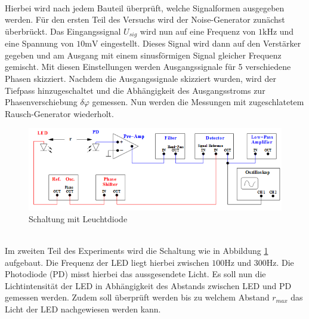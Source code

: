 \\
Hierbei wird nach jedem Bauteil überprüft, welche Signalformen ausgegeben werden.
Für den ersten Teil des Versuchs wird der Noise-Generator zunächst überbrückt.
Das Eingangssignal $U_{sig}$ wird nun auf eine Frequenz von $1\si{\kilo\hertz}$
und eine Spannung von $10\si{\milli\volt}$ eingestellt. Dieses Signal wird dann
auf den Verstärker gegeben und am Ausgang mit einem sinusförmigen Signal gleicher
Frequenz gemischt. Mit diesen Einstellungen werden Ausgangssignale für 5 verschiedene
Phasen skizziert.
Nachdem die Ausgangssignale skizziert wurden, wird der Tiefpass hinzugeschaltet
und die Abhängigkeit des Ausgangsstroms zur Phasenverschiebung
$\delta\varphi$ gemessen.
Nun werden die Messungen mit zugeschlatetem Rausch-Generator wiederholt.
\\
\begin{figure}
  \centering
  \includegraphics[width=\textwidth]{Bilder/LEDSchaltung.jpg}
  \caption{Schaltung mit Leuchtdiode \cite{303}}
  \label{fig:led}
\end{figure}  %
\\
Im zweiten Teil des Experiments wird die Schaltung wie in Abbildung \ref{fig:led}
aufgebaut. Die Frequenz der LED liegt hierbei zwischen $100 \si{\hertz}$ und
$300 \si{\hertz}$.
Die Photodiode (PD) misst hierbei das aussgesendete Licht.
Es soll nun die Lichtintensität der LED in Abhängigkeit des Abstands
zwischen LED und PD gemessen werden. Zudem soll überprüft werden bis zu welchem
Abstand $r_{max}$ das Licht der LED nachgewiesen werden kann.
\newpage
